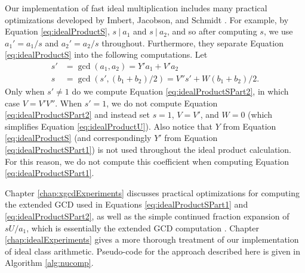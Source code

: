 \documentclass{ucalgthes1}
\theoremstyle{definition}
\begin{document}
Our implementation of fast ideal multiplication includes many practical optimizations developed by Imbert, Jacobson, and Schmidt \cite[Algorithm~6]{Imbert2010}.  For example, by Equation \ref{eq:idealProductS}, $s ~|~ a_1$ and $s ~|~ a_2$, and so after computing $s$, we use ${a_1}' = a_1/s$ and ${a_2}' = a_2/s$ throughout.  Furthermore, they separate Equation \ref{eq:idealProductS} into the following computations. Let
\begin{align}
s' &= \gcd(a_1, a_2) = Y'a_1 + V'a_2 \label{eq:idealProductSPart1} \\
s  &= \gcd(s', (b_1 + b_2)/2) = V''s'+W(b_1+b_2)/2. \label{eq:idealProductSPart2} 
\end{align}
Only when $s' \neq 1$ do we compute Equation \ref{eq:idealProductSPart2}, in which case $V = V'V''$.  When $s' = 1$, we do not compute Equation \ref{eq:idealProductSPart2} and instead set $s = 1$, $V = V'$, and $W=0$ (which simplifies Equation \ref{eq:idealProductU}).  Also notice that $Y$ from Equation \ref{eq:idealProductS} (and correspondingly $Y'$ from Equation \ref{eq:idealProductSPart1}) is not used throughout the ideal product calculation.  For this reason, we do not compute this coefficient when computing Equation \ref{eq:idealProductSPart1}.

Chapter \ref{chap:xgcdExperiments} discusses practical optimizations for computing the extended GCD used in Equations \ref{eq:idealProductSPart1} and \ref{eq:idealProductSPart2}, as well as the simple continued fraction expansion of $sU/a_1$, which is essentially the extended GCD computation \cite[\S 3.2]{Jacobson2009}.  Chapter \ref{chap:idealExperiments} gives a more thorough treatment of our implementation of ideal class arithmetic.  Pseudo-code for the approach described here is given in Algorithm \ref{alg:nucomp}.
\end{document}
